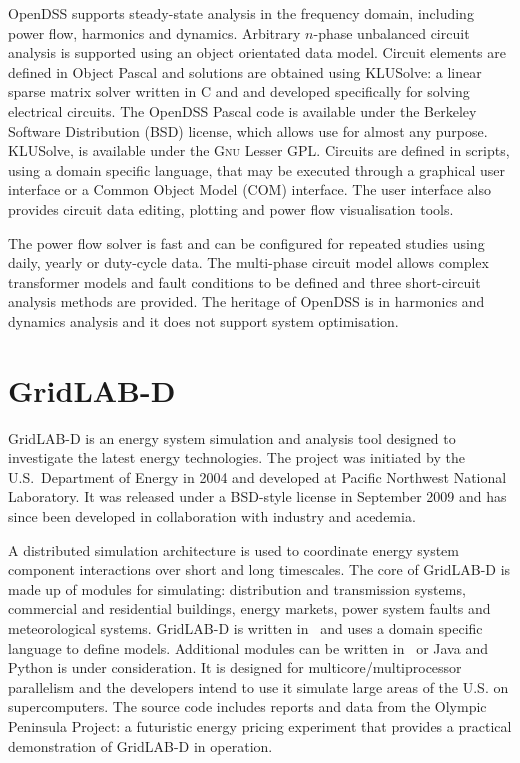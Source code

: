 OpenDSS supports steady-state analysis in the frequency domain, including power
flow, harmonics and dynamics.  Arbitrary $n$-phase unbalanced circuit analysis
is supported using an object orientated data model.  Circuit elements are
defined in Object Pascal and solutions are obtained using KLUSolve: a linear
sparse matrix solver written in C and \CC and developed specifically for solving
electrical circuits. The OpenDSS Pascal code is available under the Berkeley
Software Distribution (BSD) license, which allows use for almost any purpose.
KLUSolve, is available under the \textsc{Gnu} Lesser GPL. Circuits are defined
in scripts, using a domain specific language, that may be executed through a
graphical user interface or a Common Object Model (COM) interface. The user
interface also provides circuit data editing, plotting and power flow
visualisation tools.

The power flow solver is fast and can be configured for repeated studies using
daily, yearly or duty-cycle data.  The multi-phase circuit model allows complex
transformer models and fault conditions to be defined and three short-circuit
analysis methods are provided.  The heritage of OpenDSS is in harmonics and
dynamics analysis and it does not support system optimisation.

\section{GridLAB-D}
GridLAB-D is an energy system simulation and analysis tool
designed to investigate the latest energy technologies.  The project was
initiated by the U.S.~Department of Energy in 2004 and developed at Pacific
Northwest National Laboratory.  It was released under a BSD-style license in
September 2009 and has since been developed in collaboration with industry and
acedemia.

A distributed simulation architecture is used to coordinate energy system
component interactions over short and long timescales.  The core of GridLAB-D is
made up of modules for simulating: distribution and transmission systems,
commercial and residential buildings, energy markets, power system faults and
meteorological systems.  GridLAB-D is written in \CC~and uses a domain specific
language to define models.  Additional modules can be written in \CC~or Java and
Python is under consideration.  It is designed for multicore/multiprocessor
parallelism and the developers intend to use it simulate large areas of the U.S.
on supercomputers.  The source code includes reports and data from the Olympic
Peninsula Project: a futuristic energy pricing experiment that provides a
practical demonstration of GridLAB-D in operation.

